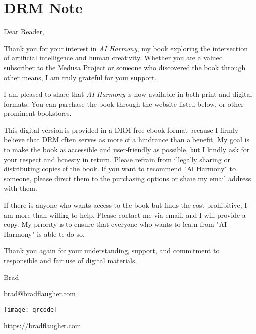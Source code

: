 \let\cleardoublepage\clearpage
\chapter{DRM Note}

Dear Reader,

Thank you for your interest in \textit{AI Harmony}, my  book exploring the intersection of artificial intelligence and human creativity. Whether you are a valued subscriber to \href{https://www.patreon.com/bradflaugher}{the Medusa Project} or someone who discovered the book through other means, I am truly grateful for your support.

I am pleased to share that \textit{AI Harmony} is now available in both print and digital formats. You can purchase the book through the website listed below, or other prominent bookstores.

This digital version is provided in a DRM-free ebook format because I firmly believe that DRM often serves as more of a hindrance than a benefit. My goal is to make the book as accessible and user-friendly as possible, but I kindly ask for your respect and honesty in return. Please refrain from illegally sharing or distributing copies of the book. If you want to recommend "AI Harmony" to someone, please direct them to the purchasing options or share my email address with them.

If there is anyone who wants access to the book but finds the cost prohibitive, I am more than willing to help. Please contact me via email, and I will provide a copy. My priority is to ensure that everyone who wants to learn from "AI Harmony" is able to do so.

Thank you again for your understanding, support, and commitment to responsible and fair use of digital materials.

Brad

\href{mailto:brad@bradflaugher.com}{brad@bradflaugher.com}

\vfill

\texttt{[image: qrcode]}

\url{https://bradflaugher.com}
